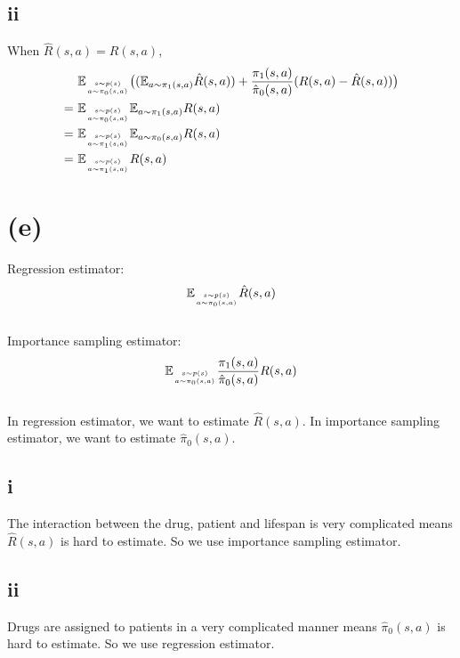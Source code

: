 \documentclass[11pt, a4paper]{article}
\begin{document}
    \subsection*{ii}
    When $\hat{R}(s,a) = R(s,a)$,
    \begin{align*}
        & \ \mathbb{E}_{\genfrac{}{}{0pt}{2}{s \sim p(s)}{a \sim \pi_0(s,a)}}
        \big(
            (\mathbb{E}_{a \sim \pi_1(s,a)} \hat{R}(s,a))
            + \frac{\pi_1(s,a)}{\hat{\pi}_0(s,a)} (R(s,a) - \hat{R}(s,a))
        \big) \\
        = & \ \mathbb{E}_{\genfrac{}{}{0pt}{2}{s \sim p(s)}{a \sim \pi_0(s,a)}}
        \mathbb{E}_{a \sim \pi_1(s,a)} R(s,a) \\
        = & \ \mathbb{E}_{\genfrac{}{}{0pt}{2}{s \sim p(s)}{a \sim \pi_1(s,a)}}
        \mathbb{E}_{a \sim \pi_0(s,a)} R(s,a) \\
        = & \ \mathbb{E}_{\genfrac{}{}{0pt}{2}{s \sim p(s)}{a \sim \pi_1(s,a)}} R(s,a)
    \end{align*}

    \section*{(e)}
    Regression estimator:
    $$\mathbb{E}_{\genfrac{}{}{0pt}{2}{s \sim p(s)}{a \sim \pi_0(s,a)}}
    \hat{R}(s,a)$$
    \\
    Importance sampling estimator:
    $$\mathbb{E}_{\genfrac{}{}{0pt}{2}{s \sim p(s)}{a \sim \pi_0(s,a)}}
    \frac{\pi_1 (s, a)}{\hat{\pi}_0 (s,a)} R(s,a)$$
    \\
    In regression estimator, we want to estimate $\hat{R}(s,a)$.
    In importance sampling estimator, we want to estimate $\hat{\pi}_0(s,a)$.

    \subsection*{i}
    The interaction between the drug, patient and lifespan is very complicated
    means $\hat{R}(s,a)$ is hard to estimate. So we use importance sampling estimator.

    \subsection*{ii}
    Drugs are assigned to patients in a very complicated manner
    means $\hat{\pi}_0(s,a)$ is hard to estimate. So we use regression estimator.
\end{document}
